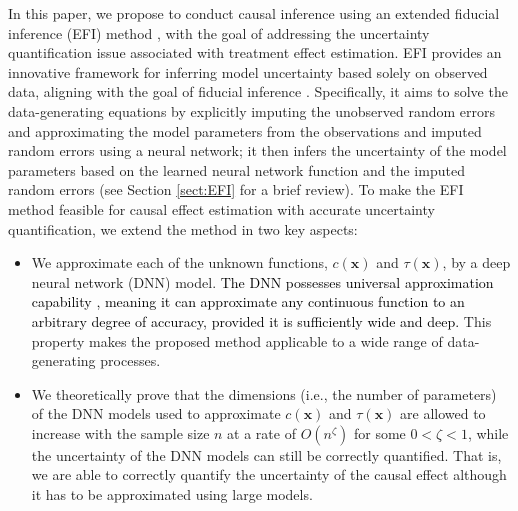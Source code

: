 \documentclass[11pt]{article}
\newcommand{\bx}{{\boldsymbol x}}
\begin{document}
 In this paper, we propose to conduct causal inference using an extended fiducial inference (EFI) method \citep{LiangKS2024EFI}, with the goal of addressing the uncertainty quantification issue associated with treatment effect estimation.  
{\color{black} EFI provides an innovative framework for inferring model uncertainty based solely on observed data, aligning with the goal of fiducial inference \citep{Fisher1935The,hannig2009gfi}. 
Specifically, it aims to solve the data-generating equations by explicitly imputing the unobserved random errors and approximating the model parameters from the observations and imputed random errors using a neural network; it then infers the uncertainty of the model parameters based on the learned neural network function and the imputed random errors (see Section \ref{sect:EFI} for a brief review).}
To make the EFI method feasible for causal effect estimation with accurate uncertainty quantification, we extend the method in two key aspects:
\begin{itemize} 
\item[(i)]  We approximate each of the unknown functions, $c(\bx)$ and $\tau(\bx)$, by a deep neural network (DNN) model. 
\textcolor{black}{The DNN possesses universal approximation capability \citep{HornikSW1989,
Hornik1991ApproximationCO,Kidger2020UniversalAW}, meaning it can approximate any continuous function to an arbitrary degree of accuracy, provided it is sufficiently wide and deep.} This property makes the proposed method applicable to a wide range of data-generating processes.
 

\item[(ii)] We theoretically prove that the dimensions (i.e., the number of parameters) 
of the DNN models used to approximate $c(\bx)$ and $\tau(\bx)$ are allowed to increase with the sample size $n$ at a rate of $O(n^{\zeta})$ for some $0< \zeta<1$, while the uncertainty of the DNN models can still be correctly quantified. That is, we are able to correctly quantify 
the uncertainty of the causal effect although it has to be approximated using large models. 
\end{itemize} 
\end{document}
